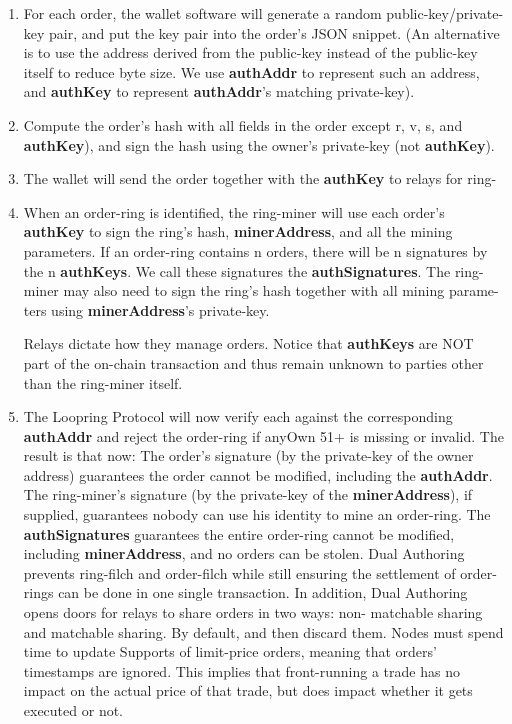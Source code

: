 \documentclass[]{article}
\begin{document}
		\begin{enumerate}
			\item For each order, the wallet software will generate a
			random public-key/private-key pair, and put the key
			pair into the order's JSON snippet. (An alternative is
			to use the address derived from the public-key instead
			of the public-key itself to reduce byte size. We use
			\textbf{authAddr} to represent such an address, and \textbf{authKey}
			to represent \textbf{authAddr}'s matching private-key).
			\item Compute the order's hash with all fields in the order
			except r, v, s, and \textbf{authKey}), and sign the hash using
			the owner's private-key (not \textbf{authKey}).
			\item The wallet will send the order together with the
			\textbf{authKey} to relays for ring-
			\item When an order-ring is identified, the ring-miner will
			use each order's \textbf{authKey} to sign the ring's hash,
			\textbf{minerAddress}, and all the mining parameters. If an
			order-ring contains n orders, there will be n signatures
			by the n \textbf{authKeys}. We call these signatures the
			\textbf{authSignatures}. The ring-miner may also need to
			sign the ring's hash together with all mining parame-
			ters using \textbf{minerAddress}'s private-key.
		
			Relays dictate how they manage orders.
			Notice that \textbf{authKeys} are NOT part
			of the on-chain transaction and thus remain unknown
			to parties other than the ring-miner itself.
			\item The Loopring Protocol will now verify each
			against the corresponding \textbf{authAddr}
			and reject the order-ring if anyOwn 51+%
			is missing or invalid.
			The result is that now:
			The order's signature (by the private-key of the owner
			address) guarantees the order cannot be modified,
			including the \textbf{authAddr}.
			The ring-miner's signature (by the private-key of the
			\textbf{minerAddress}), if supplied, guarantees nobody can
			use his identity to mine an order-ring.
			The \textbf{authSignatures} guarantees the entire order-ring
			cannot be modified, including \textbf{minerAddress}, and no
			orders can be stolen.
			Dual Authoring prevents ring-filch and order-filch while
			still ensuring the settlement of order-rings can be done
			in one single transaction. In addition, Dual Authoring
			opens doors for relays to share orders in two ways: non-
			matchable sharing and matchable sharing. By default,	
			and then discard them. Nodes must spend time to update
			Supports of limit-price orders, meaning that orders'
			timestamps are ignored.
			This implies that front-running a trade has no impact on
			the actual price of that trade, but does impact whether it
			gets executed or not.
			\end{enumerate}
		
\end{document}
